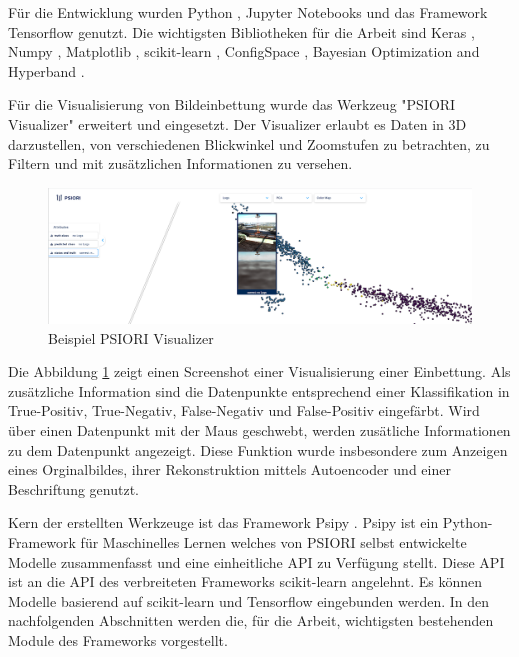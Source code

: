 	Für die Entwicklung wurden Python \cite{PythonSoftwareFoundation.2020}, Jupyter Notebooks \cite{ProjectJupyter} und das Framework Tensorflow \cite{MartinAbadi.2015}  genutzt. Die wichtigsten Bibliotheken für die Arbeit sind Keras \cite{Chollet.2015} , Numpy \cite{Oliphant.2006} , Matplotlib \cite{Hunter.2007} , scikit-learn \cite{Pedregosa.2011} , ConfigSpace \cite{Lindauer.8162019} , Bayesian Optimization and Hyperband \cite{StefanFalkner.2018} . 
	
	Für die Visualisierung von Bildeinbettung wurde das Werkzeug "PSIORI Visualizer" erweitert und eingesetzt. Der Visualizer erlaubt es Daten in 3D darzustellen, von verschiedenen Blickwinkel und Zoomstufen zu betrachten, zu Filtern und mit zusätzlichen Informationen zu versehen. 
	\begin{figure}[h]
		\centering
		\includegraphics[width=1\textwidth, center]{bilder/Grundlagen/Example_Visualizer.png}
		\caption[Beispiel PSIORI Visualizer]{Beispiel PSIORI Visualizer}
		\label{img:ExampleVisualizer}
	\end{figure}  
	Die Abbildung \ref{img:ExampleVisualizer} zeigt einen Screenshot einer Visualisierung einer  Einbettung. Als zusätzliche Information sind die Datenpunkte entsprechend einer Klassifikation in True-Positiv, True-Negativ, False-Negativ und False-Positiv eingefärbt. Wird über einen Datenpunkt mit der Maus geschwebt, werden zusätliche Informationen zu dem Datenpunkt angezeigt. Diese Funktion wurde insbesondere zum Anzeigen eines Orginalbildes, ihrer Rekonstruktion mittels Autoencoder und einer Beschriftung  genutzt. 
	
	Kern der erstellten Werkzeuge ist das Framework  Psipy \cite{PSIORIGmbH.2019}. Psipy ist ein Python-Framework für Maschinelles Lernen welches von PSIORI selbst entwickelte Modelle zusammenfasst und eine einheitliche API zu Verfügung stellt. Diese API ist an die API des verbreiteten Frameworks scikit-learn angelehnt. Es können Modelle basierend auf scikit-learn  und Tensorflow eingebunden werden. 	
	In den nachfolgenden Abschnitten werden die, für die Arbeit, wichtigsten bestehenden Module des Frameworks vorgestellt.
	

